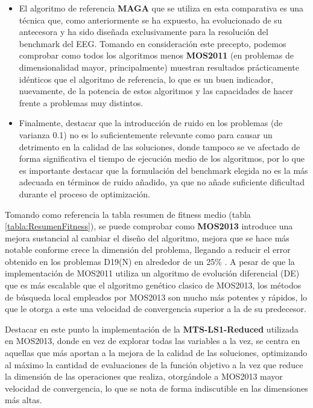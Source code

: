 \begin{itemize}
	\item El algoritmo de referencia \textbf{MAGA} que se utiliza en esta comparativa es una técnica que, como anteriormente se ha expuesto, ha evolucionado de su antecesora y ha sido diseñada exclusivamente para la resolución del benchmark del EEG. Tomando en consideración este precepto, podemos comprobar como todos los algoritmos menos \textbf{MOS2011} (en problemas de dimensionalidad mayor, principalmente) muestran resultados prácticamente idénticos que el algoritmo de referencia, lo que es un buen indicador, nuevamente, de la potencia de estos algoritmos y las capacidades de hacer frente a problemas muy distintos.
	
	\item Finalmente, destacar que la introducción de ruido en los problemas (de varianza 0.1) no es lo suficientemente relevante como para causar un detrimento en la calidad de las soluciones, donde tampoco se ve afectado de forma significativa el tiempo de ejecución medio de los algoritmos, por lo que es importante destacar que la formulación del benchmark elegida no es la más adecuada en términos de ruido añadido, ya que no añade suficiente dificultad durante el proceso de optimización.
\end{itemize}

Tomando como referencia la tabla resumen de fitness medio (tabla \ref{tabla:ResumenFitness}), se puede comprobar como \textbf{MOS2013} introduce una mejora sustancial al cambiar el diseño del algoritmo, mejora que se hace más notable conforme crece la dimensión del problema, llegando a reducir el error obtenido en los problemas D19(N) en alrededor de un 25\% . A pesar de que la implementación de MOS2011 utiliza un algoritmo de evolución diferencial (DE) que es más escalable que el algoritmo genético clasico de MOS2013, los métodos de búsqueda local empleados por MOS2013 son mucho más potentes y rápidos, lo que le otorga a este una velocidad de convergencia superior a la de su predecesor. 

Destacar en este punto la implementación de la \textbf{MTS-LS1-Reduced} utilizada en MOS2013, donde en vez de explorar todas las variables a la vez, se centra en aquellas que más aportan a la mejora de la calidad de las soluciones, optimizando al máximo la cantidad de evaluaciones de la función objetivo a la vez que reduce la dimensión de las operaciones que realiza, otorgándole a MOS2013 mayor velocidad de convergencia, lo que se nota de forma indiscutible en las dimensiones más altas.

